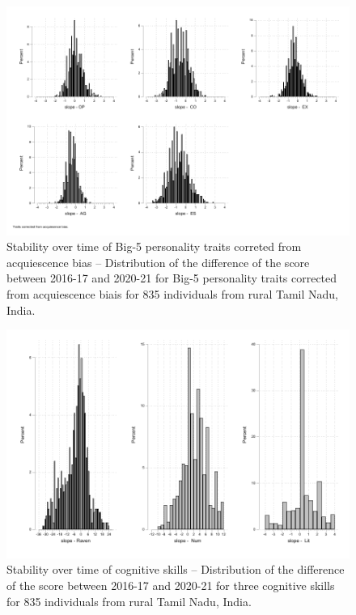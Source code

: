 \documentclass[a4paper, 12pt, onecolumn]{article}
\begin{document}
\begin{figure}[!htb]
\raggedright
\includegraphics[scale=0.86]{INPUT/diffcont_cor}
\caption{Stability over time of Big-5 personality traits correted from acquiescence bias -- Distribution of the difference of the score between 2016-17 and 2020-21 for Big-5 personality traits corrected from acquiescence biais for 835 individuals from rural Tamil Nadu, India.}
\label{fig:stabcor}
\end{figure}

\begin{figure}[!htb]
\raggedright
\includegraphics[scale=0.86]{INPUT/diffcont_cog}
\caption{Stability over time of cognitive skills -- Distribution of the difference of the score between 2016-17 and 2020-21 for three cognitive skills for 835 individuals from rural Tamil Nadu, India.}
\label{fig:stabcog}
\end{figure}
\end{document}
